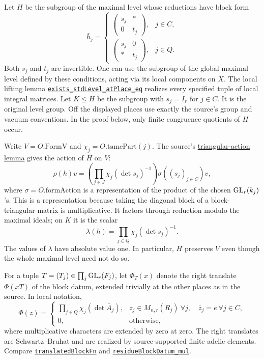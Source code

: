 \documentclass[11pt,letterpaper]{article}
\newcommand{\baseurl}{https://github.com/VladimirReshetnikov/ProveIt/blob/9050b04000647d588d0c78d945180abcd3b0bcf7/Analysis/GeneralizedRiemannHypothesis/}
\newcommand{\src}[3]{\href{\baseurl Lean/grh/src/#1.lean\#L#2}{#3}}
\newcommand{\bottomref}[2]{\src{New/OneLift/FalseLifts/BottomOfTower}{#1}{#2}}
\begin{document}
Let $H$ be the subgroup of the maximal level whose reductions have block form
\[
 \bar h_j=\begin{cases}
 \begin{pmatrix}s_j&*\\0&t_j\end{pmatrix},&j\in C,\\[3pt]
 \begin{pmatrix}s_j&0\\ *&t_j\end{pmatrix},&j\in Q.
 \end{cases}
\]
Both $s_j$ and $t_j$ are invertible. One can use the subgroup of the global maximal level defined by these conditions, acting via its local components on $X$. The local lifting lemma \bottomref{672}{\texttt{exists\_stdLevel\_atPlace\_eq}} realizes every specified tuple of local integral matrices. Let $K\le H$ be the subgroup with $s_j=I_r$ for $j\in C$. It is the original level group. Off the displayed places use exactly the source's group and vacuum conventions. In the proof below, only finite congruence quotients of $H$ occur.

Write $V=O.\mathrm{FormV}$ and $\chi_j=O.\mathrm{tamePart}(j)$. The source's \bottomref{998}{triangular-action lemma} gives the action of $H$ on $V$:
\begin{equation}\label{eq:rho}
 \rho(h)v=\left(\prod_{j\in J}\chi_j(\det s_j)^{-1}\right)
 \sigma((s_j)_{j\in C})v,
\end{equation}
where $\sigma=O.\mathrm{formAction}$ is a representation of the product of the chosen $\mathrm{GL}_r(k_j)$'s. This is a representation because taking the diagonal block of a block-triangular matrix is multiplicative. It factors through reduction modulo the maximal ideals; on $K$ it is the scalar
\[
 \lambda(h)=\prod_{j\in Q}\chi_j(\det s_j)^{-1}.
\]
The values of $\lambda$ have absolute value one. In particular, $H$ preserves $V$ even though the whole maximal level need not do so.

For a tuple $T=(T_j)\in\prod_j\mathrm{GL}_r(F_j)$, let $\Phi_T(x)$ denote the right translate $\Phi(xT)$ of the block datum, extended trivially at the other places as in the source. In local notation,
\begin{equation}\label{eq:phi}
 \Phi(z)=\begin{cases}
 \displaystyle\prod_{j\in Q}\chi_j(\det\bar A_j),&
 z_j\in M_{n,r}(R_j)\ \forall j,\quad \bar z_j=e\ \forall j\in C,\\
 0,&\text{otherwise},
 \end{cases}
\end{equation}
where multiplicative characters are extended by zero at zero. The right translates are Schwartz--Bruhat and are realized by source-supported finite adelic elements. Compare \bottomref{697}{\texttt{translatedBlockFn}} and \bottomref{721}{\texttt{residueBlockDatum\_mul}}.
\end{document}
